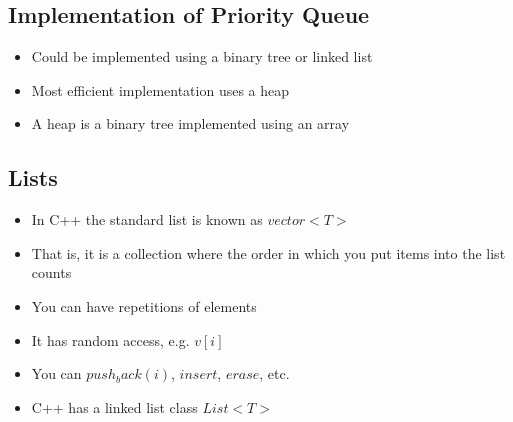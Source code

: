 \begin{slide}
\section{Implementation of Priority Queue}

\begin{PauseHighLight}
  \begin{itemize}
  \item Could be implemented using a binary tree or linked list\pause
  \item Most efficient implementation uses a heap\pause
  \item A heap is a binary tree implemented using an array\pause
  \end{itemize}

\end{PauseHighLight}

\end{slide}


\Outline


\begin{slide}
\section{Lists}

\begin{PauseHighLight}
  \begin{itemize}
  \item In C++ the standard list is known as \jl$vector<T>$\pause
  \item That is, it is a collection where the order in which you put
    items into the list counts\pause
  \item You can have repetitions of elements\pause
  \item It has random access, e.g. \jl$v[i]$\pause
  \item You can \jl$push_back(i)$, \jl$insert$, \jl$erase$, etc.\pause
  \item C++ has a linked list class \jl$List<T>$\pause
  \end{itemize}
\end{PauseHighLight}

\end{slide}


